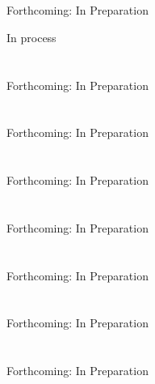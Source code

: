 \documentclass{report}
\begin{document}
% 
\chapter{}
Forthcoming: In Preparation

In process




% 
\chapter{}
Forthcoming: In Preparation

% 
\chapter{}
Forthcoming: In Preparation

% 
\chapter{}
Forthcoming: In Preparation

% 
\chapter{}
Forthcoming: In Preparation

% 
\chapter{}
Forthcoming: In Preparation

% 
\chapter{}
Forthcoming: In Preparation

% 
\chapter{}
Forthcoming: In Preparation
\end{document}
